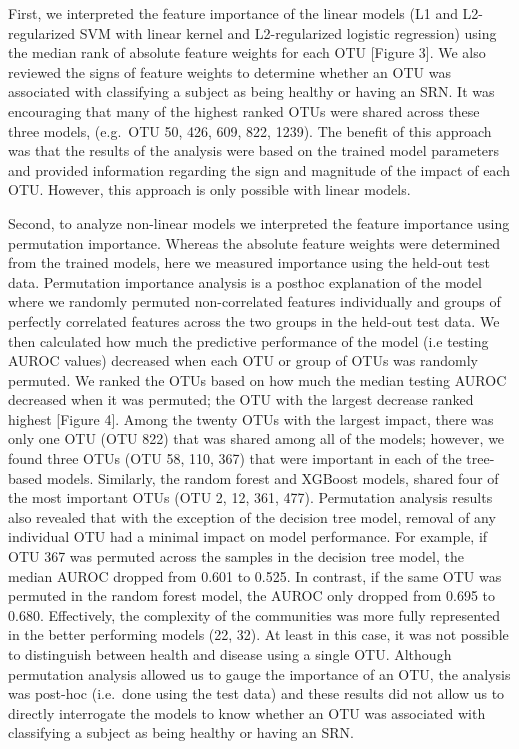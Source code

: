 \documentclass[11pt,]{article}
\begin{document}
First, we interpreted the feature importance of the linear models (L1
and L2-regularized SVM with linear kernel and L2-regularized logistic
regression) using the median rank of absolute feature weights for each
OTU {[}Figure 3{]}. We also reviewed the signs of feature weights to
determine whether an OTU was associated with classifying a subject as
being healthy or having an SRN. It was encouraging that many of the
highest ranked OTUs were shared across these three models, (e.g.~OTU 50,
426, 609, 822, 1239). The benefit of this approach was that the results
of the analysis were based on the trained model parameters and provided
information regarding the sign and magnitude of the impact of each OTU.
However, this approach is only possible with linear models.

Second, to analyze non-linear models we interpreted the feature
importance using permutation importance. Whereas the absolute feature
weights were determined from the trained models, here we measured
importance using the held-out test data. Permutation importance analysis
is a posthoc explanation of the model where we randomly permuted
non-correlated features individually and groups of perfectly correlated
features across the two groups in the held-out test data. We then
calculated how much the predictive performance of the model (i.e testing
AUROC values) decreased when each OTU or group of OTUs was randomly
permuted. We ranked the OTUs based on how much the median testing AUROC
decreased when it was permuted; the OTU with the largest decrease ranked
highest {[}Figure 4{]}. Among the twenty OTUs with the largest impact,
there was only one OTU (OTU 822) that was shared among all of the
models; however, we found three OTUs (OTU 58, 110, 367) that were
important in each of the tree-based models. Similarly, the random forest
and XGBoost models, shared four of the most important OTUs (OTU 2, 12,
361, 477). Permutation analysis results also revealed that with the
exception of the decision tree model, removal of any individual OTU had
a minimal impact on model performance. For example, if OTU 367 was
permuted across the samples in the decision tree model, the median AUROC
dropped from 0.601 to 0.525. In contrast, if the same OTU was permuted
in the random forest model, the AUROC only dropped from 0.695 to 0.680.
Effectively, the complexity of the communities was more fully
represented in the better performing models (22, 32). At least in this
case, it was not possible to distinguish between health and disease
using a single OTU. Although permutation analysis allowed us to gauge
the importance of an OTU, the analysis was post-hoc (i.e.~done using the
test data) and these results did not allow us to directly interrogate
the models to know whether an OTU was associated with classifying a
subject as being healthy or having an SRN.
\end{document}
